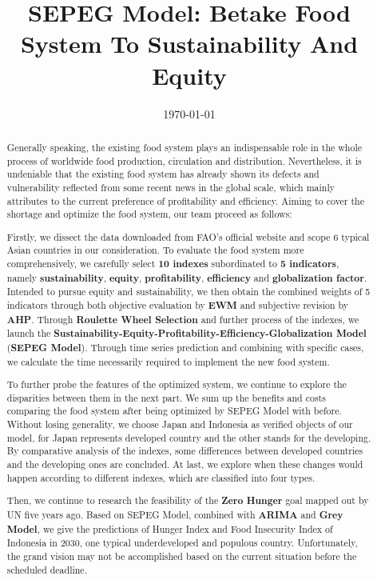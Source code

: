 \documentclass{mcmthesis}
\begin{document}
\linespread{0.6} %
\setlength{\parskip}{0.5\baselineskip} %
\title{SEPEG Model: Betake Food System To Sustainability And Equity}

\date{\today}
\begin{abstract}
 	 
Generally speaking, the existing food system plays an indispensable role in the whole process of worldwide food production, circulation and distribution. Nevertheless, it is undeniable that the existing food system has already shown its defects and vulnerability reflected from some recent news in the global scale, which mainly attributes to the current preference of profitability and efficiency. Aiming to cover the shortage and optimize the food system, our team proceed as follows:
 	
Firstly, we dissect the data downloaded from FAO's official website and scope 6 typical Asian countries in our consideration. To evaluate the food system more comprehensively, we carefully select \textbf{10 indexes} subordinated to \textbf{5 indicators}, namely \textbf{sustainability}, \textbf{equity}, \textbf{profitability}, \textbf{efficiency} and \textbf{globalization factor}. Intended to pursue equity and sustainability, we then obtain the combined weights of 5 indicators through both objective evaluation by \textbf{EWM} and subjective revision by \textbf{AHP}. Through \textbf{Roulette Wheel Selection} and further process of the indexes, we launch the \textbf{Sustainability-Equity-Profitability-Efficiency-Globalization Model} (\textbf{SEPEG Model}). Through time series prediction and combining with specific cases, we calculate the time necessarily required to implement the new food system.

To further probe the features of the optimized system, we continue to explore the disparities between them in the next part. We sum up the benefits and costs comparing the food system after being optimized by SEPEG Model with before. Without losing generality, we choose Japan and Indonesia as verified objects of our model, for Japan represents developed country and the other stands for the developing. By comparative analysis of the indexes, some differences between developed countries and the developing ones are concluded. At last, we explore when these changes would happen according to different indexes, which are classified into four types.
 	  
Then, we continue to research the feasibility of the \textbf{Zero Hunger} goal mapped out by UN five years ago. Based on SEPEG Model, combined with \textbf{ARIMA} and \textbf{Grey Model}, we give the predictions of Hunger Index and Food Insecurity Index of Indonesia in 2030, one typical underdeveloped and populous country. Unfortunately, the grand vision may not be accomplished based on the current situation before the scheduled deadline.
 	  

\end{abstract}
\end{document}
